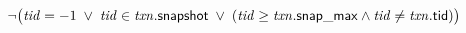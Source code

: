 
\begin{algorithm}[H]
  \begin{algorithmic}[1]
    \Procedure{\txnvis}{$\txnvar, \tidvar$}
      \State \Return
        $\lnot \big(\mathit{tid} = -1 \;\lor\;
          \mathit{tid} \in \mathit{txn}.{\sf snapshot} \;\lor\;
          (\mathit{tid} \ge \mathit{txn}.{\sf snap\_max} \land \mathit{tid} \neq \mathit{txn}.{\sf tid})\big)$
    \EndProcedure
  \end{algorithmic}
\end{algorithm}